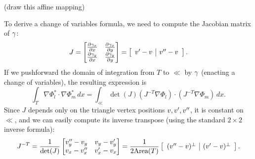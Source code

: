 \vskip 0.2in
(draw this affine mapping)
\vskip 0.2in

To derive a change of variables formula, we need to compute the Jacobian matrix of $\gamma$:
$$
    J = \begin{bmatrix} \frac{\partial \gamma_x}{\partial x} & \frac{\partial \gamma_x}{\partial y} \\ 
                        \frac{\partial \gamma_y}{\partial x} & \frac{\partial \gamma_y}{\partial y} \end{bmatrix}
      =
        \left[
        \begin{array}{c|c}
            v^{\prime} - v & v^{\prime\prime} - v
        \end{array}
        \right].
$$
If we pushforward the domain of integration from $T$ to $\ll$ by $\gamma$ (enacting a change of variables),
the resulting expression is
\begin{equation}\label{fem_closed_form_integral_complicated}
    \int_T \nabla\Phi_l^* \cdot \nabla\Phi_m^*\,dx
        = \int_\ll \det(J)(J^{-T}\nabla\Phi_l)\cdot(J^{-T}\nabla\Phi_m)\,dx.
\end{equation}
Since $J$ depends only on the triangle vertex positions $v,v^{\prime},v^{\prime\prime}$, it is constant on $\ll$, and we can easily compute its inverse transpose
(using the standard $2 \times 2$ inverse formula):
\begin{align*}
    J^{-T} = \frac{1}{\det(J)}\begin{bmatrix}
        v_y^{\prime\prime} - v_y & v_y - v^{\prime}_y \\ v_x - v_x^{\prime\prime} & v^{\prime}_x - v_x
    \end{bmatrix}
    = \frac{1}{2\text{Area}(T)}\left[\begin{array}{c|c}
        (v^{\prime\prime} - v)^\perp & (v^{\prime} - v)^\perp
    \end{array}\right].
\end{align*}

